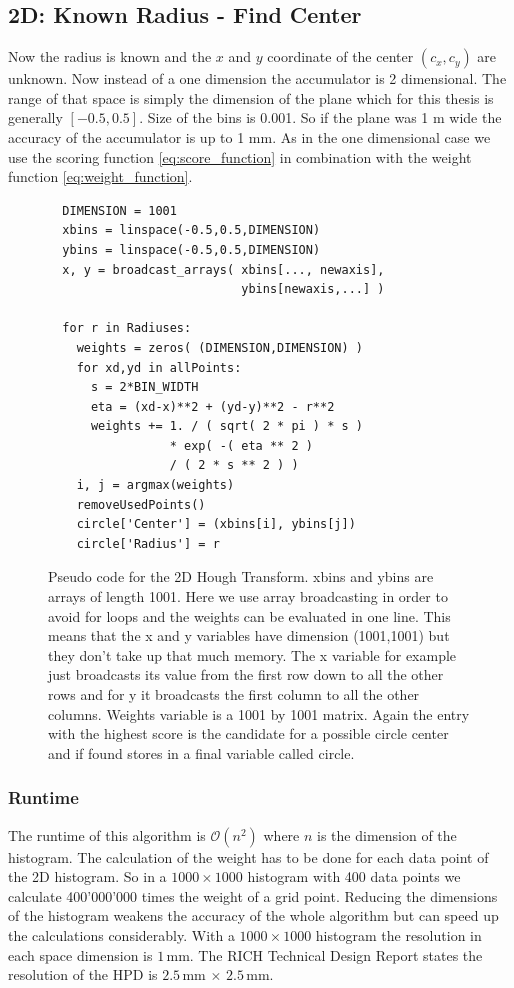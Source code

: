 \documentclass[11pt,twoside]{scrreprt}
\begin{document}

\subsection{2D: Known Radius - Find Center} %
\label{sub:2d_known_radius_find_center}
Now the radius is known and the $x$ and $y$ coordinate of the center $(c_x, c_y)$ are unknown. Now instead of a one dimension the accumulator is 2 dimensional. The range of that space is simply the dimension of the plane which for this thesis is generally $[-0.5,0.5]$. Size of the bins is 0.001. So if the plane was 1 m wide the accuracy of the accumulator is up to 1 mm. As in the one dimensional case we use the scoring function \ref{eq:score_function} in combination with the weight function \ref{eq:weight_function}.

\begin{figure}[b]
\begin{lstlisting}
  DIMENSION = 1001
  xbins = linspace(-0.5,0.5,DIMENSION)
  ybins = linspace(-0.5,0.5,DIMENSION)
  x, y = broadcast_arrays( xbins[..., newaxis], 
                           ybins[newaxis,...] )

  for r in Radiuses:
    weights = zeros( (DIMENSION,DIMENSION) )
    for xd,yd in allPoints:
      s = 2*BIN_WIDTH
      eta = (xd-x)**2 + (yd-y)**2 - r**2      
      weights += 1. / ( sqrt( 2 * pi ) * s ) 
                 * exp( -( eta ** 2 ) 
                 / ( 2 * s ** 2 ) )
    i, j = argmax(weights)
    removeUsedPoints()
    circle['Center'] = (xbins[i], ybins[j])
    circle['Radius'] = r
\end{lstlisting}
  \caption{Pseudo code for the 2D Hough Transform. xbins and ybins are arrays of length 1001. Here we use array broadcasting in order to avoid for loops and the weights can be evaluated in one line. This means that the x and y variables have dimension (1001,1001) but they don't take up that much memory. The x variable for example just broadcasts its value from the first row down to all the other rows and for y it broadcasts the first column to all the other columns. Weights variable is a 1001 by 1001 matrix. Again the entry with the highest score is the candidate for a possible circle center and if found stores in a final variable called circle.}
\end{figure}


\subsubsection{Runtime} %
\label{ssub:runtime_2d}
The runtime of this algorithm is $\mathcal{O}(n^2)$ where $n$ is the dimension of the histogram. The calculation of the weight has to be done for each data point of the 2D histogram. So in a $1000\times 1000$ histogram with 400 data points we calculate 400'000'000 times the weight of a grid point. Reducing the dimensions of the histogram weakens the accuracy of the whole algorithm but can speed up the calculations considerably. With a $1000\times 1000$ histogram the resolution in each space dimension is $1$\,mm. The RICH Technical Design Report states the resolution of the HPD is $2.5$\,mm $\times$ $2.5$\,mm.
\end{document}
